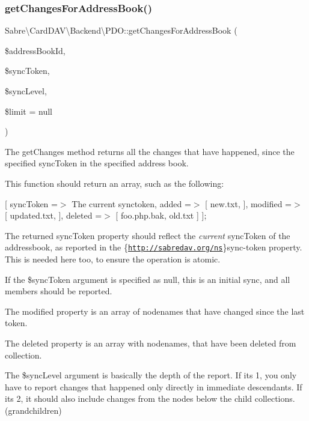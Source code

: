 \subsubsection{\texorpdfstring{get\+Changes\+For\+Address\+Book()}{getChangesForAddressBook()}}
{\footnotesize\ttfamily Sabre\textbackslash{}\+Card\+D\+A\+V\textbackslash{}\+Backend\textbackslash{}\+P\+D\+O\+::get\+Changes\+For\+Address\+Book (\begin{DoxyParamCaption}\item[{}]{\$address\+Book\+Id,  }\item[{}]{\$sync\+Token,  }\item[{}]{\$sync\+Level,  }\item[{}]{\$limit = {\ttfamily null} }\end{DoxyParamCaption})}

The get\+Changes method returns all the changes that have happened, since the specified sync\+Token in the specified address book.

This function should return an array, such as the following\+:

\mbox{[} \textquotesingle{}sync\+Token\textquotesingle{} =$>$ \textquotesingle{}The current synctoken\textquotesingle{}, \textquotesingle{}added\textquotesingle{} =$>$ \mbox{[} \textquotesingle{}new.\+txt\textquotesingle{}, \mbox{]}, \textquotesingle{}modified\textquotesingle{} =$>$ \mbox{[} \textquotesingle{}updated.\+txt\textquotesingle{}, \mbox{]}, \textquotesingle{}deleted\textquotesingle{} =$>$ \mbox{[} \textquotesingle{}foo.\+php.\+bak\textquotesingle{}, \textquotesingle{}old.\+txt\textquotesingle{} \mbox{]} \mbox{]};

The returned sync\+Token property should reflect the {\itshape current} sync\+Token of the addressbook, as reported in the \{\href{http://sabredav.org/ns}{\tt http\+://sabredav.\+org/ns}\}sync-\/token property. This is needed here too, to ensure the operation is atomic.

If the \$sync\+Token argument is specified as null, this is an initial sync, and all members should be reported.

The modified property is an array of nodenames that have changed since the last token.

The deleted property is an array with nodenames, that have been deleted from collection.

The \$sync\+Level argument is basically the \textquotesingle{}depth\textquotesingle{} of the report. If it\textquotesingle{}s 1, you only have to report changes that happened only directly in immediate descendants. If it\textquotesingle{}s 2, it should also include changes from the nodes below the child collections. (grandchildren)

